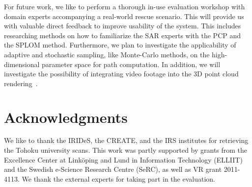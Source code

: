 \documentclass{egpubl}
\begin{document}
For future work, we like to perform a thorough in-use evaluation workshop with domain experts accompanying a real-world rescue scenario. This will provide us with valuable direct feedback to improve usability of the system. This includes researching methods on how to familiarize the SAR experts with the PCP and the SPLOM method. Furthermore, we plan to investigate the applicability of adaptive and stochastic sampling, like Monte-Carlo methods, on the high-dimensional parameter space for path computation. In addition, we will investigate the possibility of integrating video footage into the 3D point cloud rendering~\cite{1453517}.


\section*{Acknowledgments}
We like to thank the IRIDeS, the CREATE, and the IRS institutes for retrieving the Tohoku university scans. This work was partly supported by grants from the Excellence Center at Link\"oping and Lund in Information Technology (ELLIIT) and the Swedish e-Science Research Centre (SeRC), as well as VR grant 2011-4113. We thank the external experts for taking part in the evaluation.



\end{document}
